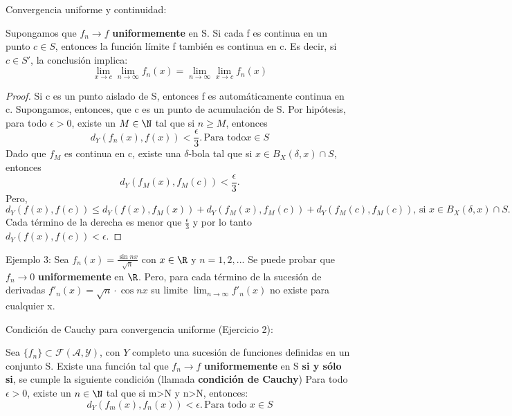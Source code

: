 \begin{frame}{Convergencia uniforme y continuidad:}
    \begin{teorema}
        Supongamos que $f_{n}\to f$ \textbf{uniformemente} en S. Si cada f es continua en un punto $c\in S$, entonces
        la función límite f también es continua en c. Es decir, si $c\in S'$, la conclusión implica:
        \[
        \lim_{x\to c}\lim_{n\to \infty}f_{n}(x)=\lim_{n\to \infty}\lim_{x\to c}f_{n}(x)
        \]
    \end{teorema}
\end{frame}

\begin{frame}{}
    \begin{proof}
    Si c es un punto aislado de S, entonces f es automáticamente continua en c. Supongamos, entonces, que c es un 
    punto de acumulación de S. Por hipótesis, para todo $\epsilon>0$, existe un $M\in \N$ tal que si $n\geq M$, entonces
    \[
    d_{Y}(f_{n}(x),f(x))<\frac{\epsilon}{3}.\,\text{Para todo} x\in S
    \]
    Dado que $f_M$ es continua en c, existe una $\delta$-bola tal que si $x\in  B_{X}(\delta,x)\cap S$, entonces
    \[
    d_{Y}(f_{M}(x),f_{M}(c))<\frac{\epsilon}{3}.
    \]
    Pero,
    \[
    d_{Y}(f(x),f(c))\leq d_{Y}(f(x),f_{M}(x))+d_{Y}(f_{M}(x),f_{M}(c))+d_{Y}(f_{M}(c),f_{M}(c)),\,\text{si } x\in  B_{X}(\delta,x)\cap S.
    \]
    Cada término de la derecha es menor que $\frac{\epsilon}{3}$ y por lo tanto $d_{Y}(f(x),f(c))<\epsilon$. 
    \end{proof}
\end{frame}

\begin{frame}{Ejemplo 3:}
    Sea $f_{n}(x)=\frac{\sin{nx}}{\sqrt{n}}$ con $x\in \R$ y $n=1,2,...$ Se puede probar que $f_{n}\to 0$ \textbf{uniformemente}
    en $\R$. Pero, para cada término de la sucesión de derivadas $f'_{n}(x)=\sqrt{n}\cdot \cos{nx}$ su limite $\lim_{n\to \infty} f'_{n}(x)$
    no existe para cualquier x.
\end{frame}


\begin{frame}{Condición de Cauchy para convergencia uniforme (Ejercicio 2):}
    \begin{teorema}
        Sea $\{f_{n}\}\subset \mathcal{F(A,Y)}$, con $Y$ completo una sucesión de funciones definidas en un conjunto S. Existe una función tal que $f_{n}\to f$
        \textbf{uniformemente} en S \textbf{si y sólo si}, se cumple la siguiente condición (llamada \textbf{condición de Cauchy})
        Para todo $\epsilon>0$, existe un $n\in \N$ tal que si m>N y n>N, entonces:
        \[
        d_{Y}(f_{m}(x),f_{n}(x))< \epsilon.\,\text{Para todo } x\in S
        \]
    \end{teorema}
\end{frame}

